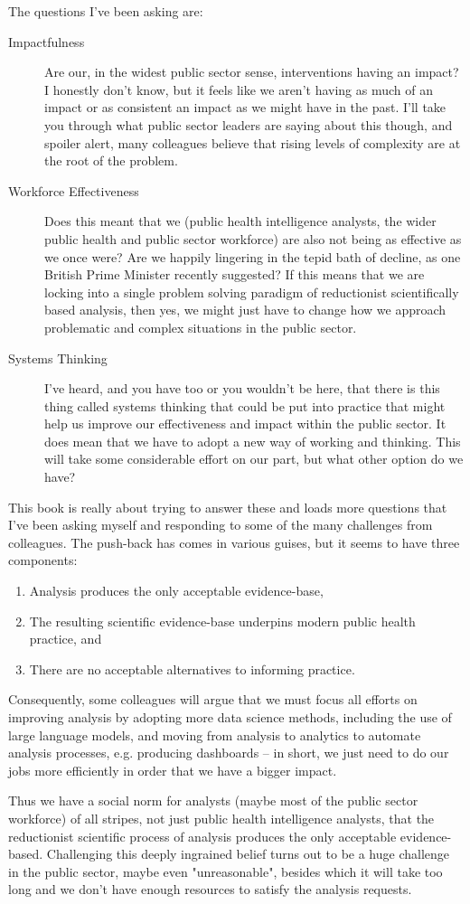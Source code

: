 The questions I've been asking are:
\begin{description}
	\item[Impactfulness] Are our, in the widest public sector sense, interventions having an impact? I honestly don't know, but it feels like we aren't having as much of an impact or as consistent an impact as we might have in the past. I'll take you through what public sector leaders are saying about this though, and spoiler alert, many colleagues believe that rising levels of complexity are at the root of the problem.
	\item[Workforce Effectiveness] Does this meant that we (public health intelligence analysts, the wider public health and public sector workforce) are also not being as effective as we once were? Are we happily lingering in the tepid bath of decline, as one British Prime Minister recently suggested? If this means that we are locking into a single problem solving paradigm of reductionist scientifically based analysis, then yes, we might just have to change how we approach problematic and complex situations in the public sector.
	\item[Systems Thinking] I've heard, and you have too or you wouldn't be here, that there is this thing called systems thinking that could be put into practice that might help us improve our effectiveness and impact within the public sector. It does mean that we have to adopt a new way of working and thinking. This will take some considerable effort on our part, but what other option do we have?
\end{description}

This book is really about trying to answer these and loads more questions that I've been asking myself and responding to some of the many challenges from colleagues. The push-back has comes in various guises, but it seems to have three components:
\begin{enumerate}[leftmargin=1 cm]
	\item Analysis produces the only acceptable evidence-base,
	\item The resulting scientific evidence-base underpins modern public health practice, and
	\item There are no acceptable alternatives to informing practice.
\end{enumerate}
Consequently, some colleagues will argue that we must focus all efforts on improving analysis by adopting more data science methods, including the use of large language models, and moving from analysis to analytics to automate analysis processes, e.g. producing dashboards -- in short, we just need to do our jobs more efficiently in order that we have a bigger impact.

Thus we have a social norm for analysts (maybe most of the public sector workforce) of all stripes, not just public health intelligence analysts, that the reductionist scientific process of analysis produces the only acceptable evidence-based. Challenging this deeply ingrained belief turns out to be a huge challenge in the public sector, maybe even "unreasonable", besides which it will take too long and we don't have enough resources to satisfy the analysis requests.




